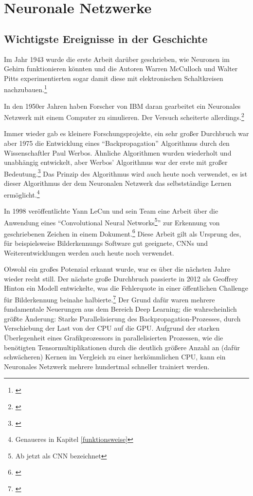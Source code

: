 \section{Neuronale Netzwerke}\label{neuronalenetzwerkekapitel}

\subsection{Wichtigste Ereignisse in der Geschichte}

Im Jahr 1943 wurde die erste Arbeit darüber geschrieben, wie Neuronen im Gehirn funktionieren könnten und die Autoren Warren McCulloch und Walter Pitts experimentierten sogar damit diese mit elektronischen Schaltkreisen nachzubauen.\footnote{\cite[]{alogicalcalculus}}

In den 1950er Jahren haben Forscher von IBM daran gearbeitet ein Neuronales Netzwerk mit einem Computer zu simulieren. Der Versuch scheiterte allerdings.\footnote{\cite[Absatz 3]{nnhistory}}

Immer wieder gab es kleinere Forschungsprojekte, ein sehr großer Durchbruch war aber 1975 die Entwicklung eines "`Backpropagation"' Algorithmus durch den Wissenschaftler Paul Werbos. Ähnliche Algorithmen wurden wiederholt und unabhängig entwickelt, aber Werbos' Algorithmus war der erste mit großer Bedeutung.\footnote{\cite[]{paulwerbosbackpropagation}} Das Prinzip des Algorithmus wird auch heute noch verwendet, es ist dieser Algorithmus der dem Neuronalen Netzwerk das selbstständige Lernen ermöglicht.\footnote{Genaueres in Kapitel \ref{funktionsweise}}

In 1998 veröffentlichte Yann LeCun und sein Team eine Arbeit über die Anwendung eines "`Convolutional Neural Networks\footnote{Ab jetzt als CNN bezeichnet}"' zur Erkennung von geschriebenen Zeichen in einem Dokument.\footnote{\cite[]{cnnhistory}} Diese Arbeit gilt als Ursprung des, für beispielsweise Bilderkennungs Software gut geeignete, CNNs und Weiterentwicklungen werden auch heute noch verwendet.

Obwohl ein großes Potenzial erkannt wurde, war es über die nächsten Jahre wieder recht still. Der nächste große Durchbruch passierte in 2012 als Geoffrey Hinton ein Modell entwickelte, was die Fehlerquote in einer öffentlichen Challenge für Bilderkennung beinahe halbierte.\footnote{\cite[]{geoffrey}} Der Grund dafür waren mehrere fundamentale Neuerungen aus dem Bereich Deep Learning; die wahrscheinlich größte Änderung: Starke Parallelisierung des Backpropagation-Prozesses, durch Verschiebung der Last von der CPU auf die GPU. Aufgrund der starken Überlegenheit eines Grafikprozessors in parallelisierten Prozessen, wie die benötigten Tensormultiplikationen durch die deutlich größere Anzahl an (dafür schwächeren) Kernen im Vergleich zu einer herkömmlichen CPU, kann ein Neuronales Netzwerk mehrere hundertmal schneller trainiert werden.

